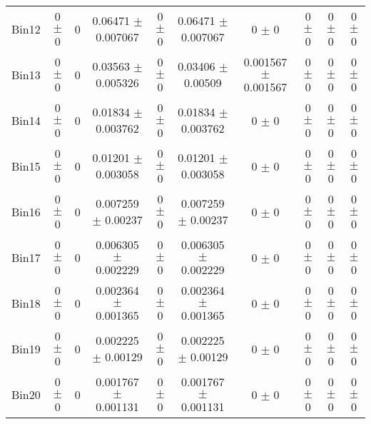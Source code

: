 \begin{tabular}{@{\extracolsep{4pt}}lccccccccc@{}}
     Bin12 & 0 $\pm$ 0 & 0 & 0.06471 $\pm$ 0.007067 & 0 $\pm$ 0 & 0.06471 $\pm$ 0.007067 & 0 $\pm$ 0 & 0 $\pm$ 0 & 0 $\pm$ 0 & 0 $\pm$ 0 \\ 
     Bin13 & 0 $\pm$ 0 & 0 & 0.03563 $\pm$ 0.005326 & 0 $\pm$ 0 & 0.03406 $\pm$ 0.00509 & 0.001567 $\pm$ 0.001567 & 0 $\pm$ 0 & 0 $\pm$ 0 & 0 $\pm$ 0 \\ 
     Bin14 & 0 $\pm$ 0 & 0 & 0.01834 $\pm$ 0.003762 & 0 $\pm$ 0 & 0.01834 $\pm$ 0.003762 & 0 $\pm$ 0 & 0 $\pm$ 0 & 0 $\pm$ 0 & 0 $\pm$ 0 \\ 
     Bin15 & 0 $\pm$ 0 & 0 & 0.01201 $\pm$ 0.003058 & 0 $\pm$ 0 & 0.01201 $\pm$ 0.003058 & 0 $\pm$ 0 & 0 $\pm$ 0 & 0 $\pm$ 0 & 0 $\pm$ 0 \\ 
     Bin16 & 0 $\pm$ 0 & 0 & 0.007259 $\pm$ 0.00237 & 0 $\pm$ 0 & 0.007259 $\pm$ 0.00237 & 0 $\pm$ 0 & 0 $\pm$ 0 & 0 $\pm$ 0 & 0 $\pm$ 0 \\ 
     Bin17 & 0 $\pm$ 0 & 0 & 0.006305 $\pm$ 0.002229 & 0 $\pm$ 0 & 0.006305 $\pm$ 0.002229 & 0 $\pm$ 0 & 0 $\pm$ 0 & 0 $\pm$ 0 & 0 $\pm$ 0 \\ 
     Bin18 & 0 $\pm$ 0 & 0 & 0.002364 $\pm$ 0.001365 & 0 $\pm$ 0 & 0.002364 $\pm$ 0.001365 & 0 $\pm$ 0 & 0 $\pm$ 0 & 0 $\pm$ 0 & 0 $\pm$ 0 \\ 
     Bin19 & 0 $\pm$ 0 & 0 & 0.002225 $\pm$ 0.00129 & 0 $\pm$ 0 & 0.002225 $\pm$ 0.00129 & 0 $\pm$ 0 & 0 $\pm$ 0 & 0 $\pm$ 0 & 0 $\pm$ 0 \\ 
     Bin20 & 0 $\pm$ 0 & 0 & 0.001767 $\pm$ 0.001131 & 0 $\pm$ 0 & 0.001767 $\pm$ 0.001131 & 0 $\pm$ 0 & 0 $\pm$ 0 & 0 $\pm$ 0 & 0 $\pm$ 0 \\ 
\hline\hline
  \end{tabular}
